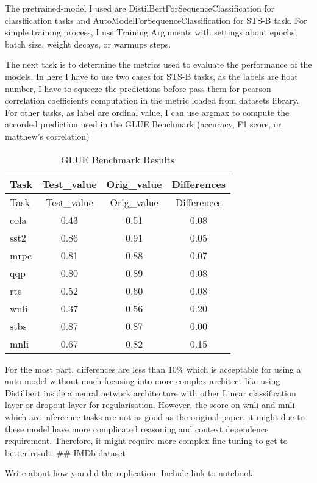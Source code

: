 \documentclass[
  11pt,
]{article}
\begin{document}
The pretrained-model I used are DistilBertForSequenceClassification for
classification tasks and AutoModelForSequenceClassification for STS-B
task. For simple training process, I use Training Arguments with
settings about epochs, batch size, weight decays, or warmups steps.

The next task is to determine the metrics used to evaluate the
performance of the models. In here I have to use two cases for STS-B
tasks, as the labels are float number, I have to squeeze the predictions
before pass them for pearson correlation coefficients computation in the
metric loaded from datasets library. For other tasks, as label are
ordinal value, I can use argmax to compute the accorded prediction used
in the GLUE Benchmark (accuracy, F1 score, or matthew's correlation)

\begin{longtable}[]{@{}lccc@{}}
\caption{GLUE Benchmark Results}\tabularnewline
\toprule\noalign{}
Task & Test\_value & Orig\_value & Differences \\
\midrule\noalign{}
\endfirsthead
\toprule\noalign{}
Task & Test\_value & Orig\_value & Differences \\
\midrule\noalign{}
\endhead
\bottomrule\noalign{}
\endlastfoot
cola & 0.43 & 0.51 & 0.08 \\
sst2 & 0.86 & 0.91 & 0.05 \\
mrpc & 0.81 & 0.88 & 0.07 \\
qqp & 0.80 & 0.89 & 0.08 \\
rte & 0.52 & 0.60 & 0.08 \\
wnli & 0.37 & 0.56 & 0.20 \\
stbs & 0.87 & 0.87 & 0.00 \\
mnli & 0.67 & 0.82 & 0.15 \\
\end{longtable}

For the most part, differences are less than 10\% which is acceptable
for using a auto model without much focusing into more complex architect
like using Distilbert inside a neural network architecture with other
Linear classification layer or dropout layer for regularisation.
However, the score on wnli and mnli which are infereence tasks are not
as good as the original paper, it might due to these model have more
complicated reasoning and context dependence requirement. Therefore, it
might require more complex fine tuning to get to better result. \#\#
IMDb dataset

Write about how you did the replication. Include link to notebook
\end{document}

